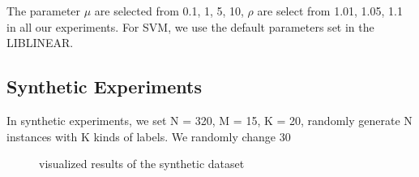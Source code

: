 \documentclass[letterpaper]{article}
\begin{document}
The parameter $\mu$ are selected from {0.1, 1, 5, 10}, $\rho$ are select from {1.01, 1.05, 1.1} in all our experiments. For SVM, we use the default parameters set in the LIBLINEAR.

\subsection{Synthetic Experiments}

In synthetic experiments, we set N = 320, M = 15, K = 20, randomly generate N instances with K kinds of labels. We randomly change 30%



\begin{figure}[htp]
\center
    \caption{visualized results of the synthetic dataset} \label{fig:ensemble_cluster}
\end{figure}
\end{document}
